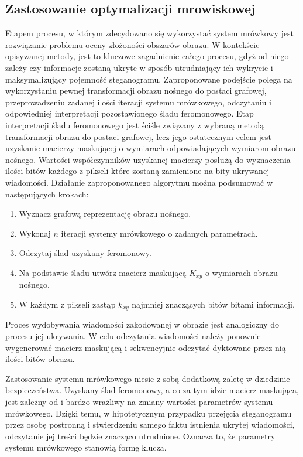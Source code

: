 {{        \subsection{Zastosowanie optymalizacji mrowiskowej}
        {
            Etapem procesu, w którym zdecydowano się wykorzystać system mrówkowy jest rozwiązanie problemu oceny
            złożoności obszarów obrazu. W kontekście opisywanej metody, jest to kluczowe zagadnienie całego procesu,
            gdyż od niego zależy czy informacje zostaną ukryte w sposób utrudniający ich wykrycie i maksymalizujący
            pojemność steganogramu. Zaproponowane podejście polega na wykorzystaniu pewnej transformacji obrazu nośnego
            do postaci grafowej, przeprowadzeniu zadanej ilości iteracji systemu mrówkowego, odczytaniu i odpowiedniej
            interpretacji pozostawionego śladu feromonowego. Etap interpretacji śladu feromonowego jest ściśle związany
            z wybraną metodą transformacji obrazu do postaci grafowej, lecz jego ostatecznym celem jest uzyskanie
            macierzy maskującej o wymiarach odpowiadających wymiarom obrazu nośnego. Wartości współczynników uzyskanej
            macierzy posłużą do wyznaczenia ilości bitów każdego z pikseli które zostaną zamienione na bity ukrywanej
            wiadomości. Działanie zaproponowanego algorytmu można podsumować w następujących krokach:

            \begin{enumerate}
                \item Wyznacz grafową reprezentację obrazu nośnego.
                \item Wykonaj $n$ iteracji systemy mrówkowego o zadanych parametrach.
                \item Odczytaj ślad uzyskany feromonowy.
                \item Na podstawie śladu utwórz macierz maskującą $K_{xy}$ o wymiarach obrazu nośnego.
                \item W każdym z pikseli zastąp $k_{xy}$ najmniej znaczących bitów bitami informacji.
            \end{enumerate}

            Proces wydobywania wiadomości zakodowanej w obrazie jest analogiczny do procesu jej ukrywania. W celu
            odczytania wiadomości należy ponownie wygenerować macierz maskującą i sekwencyjnie odczytać dyktowane przez
            nią ilości bitów obrazu.

            Zastosowanie systemu mrówkowego niesie z sobą dodatkową zaletę w dziedzinie bezpieczeństwa. Uzyskany ślad
            feromonowy, a co za tym idzie macierz maskująca, jest zależny od i bardzo wrażliwy na zmiany wartości
            parametrów systemu mrówkowego. Dzięki temu, w hipotetycznym przypadku przejęcia steganogramu przez osobę
            postronną i stwierdzeniu samego faktu istnienia ukrytej wiadomości, odczytanie jej treści będzie znacząco
            utrudnione. Oznacza to, że parametry systemu mrówkowego stanowią formę klucza.
        }
    }

}

